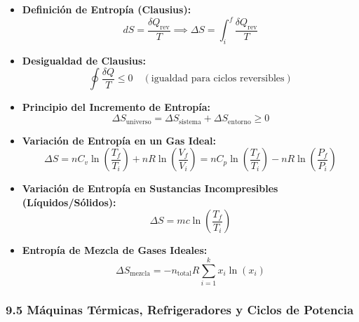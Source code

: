 \documentclass[11pt,a4paper]{article}
\begin{document}
\begin{itemize}
  \item \textbf{Definición de Entropía (Clausius):}
  \[
    dS = \frac{\delta Q_{\text{rev}}}{T} \implies \Delta S = \int_i^f \frac{\delta Q_{\text{rev}}}{T}
  \]
  \item \textbf{Desigualdad de Clausius:}
  \[
    \oint \frac{\delta Q}{T} \le 0 \quad (\text{igualdad para ciclos reversibles})
  \]
  \item \textbf{Principio del Incremento de Entropía:}
  \[
    \Delta S_{\text{universo}} = \Delta S_{\text{sistema}} + \Delta S_{\text{entorno}} \ge 0
  \]
  \item \textbf{Variación de Entropía en un Gas Ideal:}
  \[
    \Delta S = n C_v \ln\left( \frac{T_f}{T_i} \right) + n R \ln\left( \frac{V_f}{V_i} \right) = n C_p \ln\left( \frac{T_f}{T_i} \right) - n R \ln\left( \frac{P_f}{P_i} \right)
  \]
  \item \textbf{Variación de Entropía en Sustancias Incompresibles (Líquidos/Sólidos):}
  \[
    \Delta S = m c \ln\left( \frac{T_f}{T_i} \right)
  \]
  \item \textbf{Entropía de Mezcla de Gases Ideales:}
  \[
    \Delta S_{\text{mezcla}} = -n_{\text{total}} R \sum_{i=1}^k x_i \ln(x_i)
  \]
\end{itemize}

\subsubsection*{9.5 Máquinas Térmicas, Refrigeradores y Ciclos de Potencia}
\end{document}
